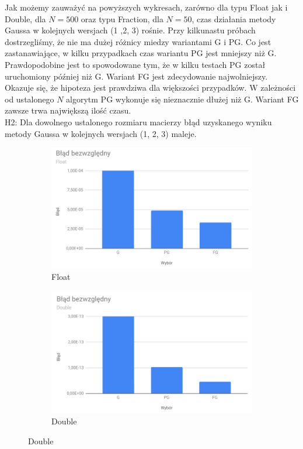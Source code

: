 \documentclass[11pt]{article}
\begin{document}
Jak możemy zauważyć na powyższych wykresach, zarówno dla typu Float jak i Double, dla $N = 500$ oraz typu Fraction, dla $N = 50$, czas działania metody Gaussa w kolejnych wersjach (1 ,2, 3) rośnie. Przy kilkunastu próbach dostrzegliśmy, że nie ma dużej różnicy miedzy wariantami G i PG. Co jest zastanawiające, w kilku przypadkach czas wariantu PG jest mniejszy niż G. Prawdopodobine jest to spowodowane tym, że w kilku testach PG został uruchomiony później niż G. Wariant FG jest zdecydowanie najwolniejszy. Okazuje się, że hipoteza jest prawdziwa dla większości przypadków. W zależności od ustalonego $N$ algorytm PG wykonuje się nieznacznie dłużej niż G. Wariant FG zawsze trwa największą ilość czasu.
\\[1\baselineskip]
H2: Dla dowolnego ustalonego rozmiaru macierzy błąd uzyskanego wyniku metody
Gaussa w kolejnych wersjach (1, 2, 3) maleje.

\begin{figure}[h!]
  \centering
  \begin{subfigure}[b]{0.45\linewidth}
    \includegraphics[width=\linewidth]{wykres_blad_float.png}
    \caption{Float}
  \end{subfigure}
  \begin{subfigure}[b]{0.45\linewidth}
    \includegraphics[width=\linewidth]{wykres_blad_double.png}
    \caption{Double}
  \end{subfigure}
  \label{fig:wykres}
\end{figure}
\end{document}
